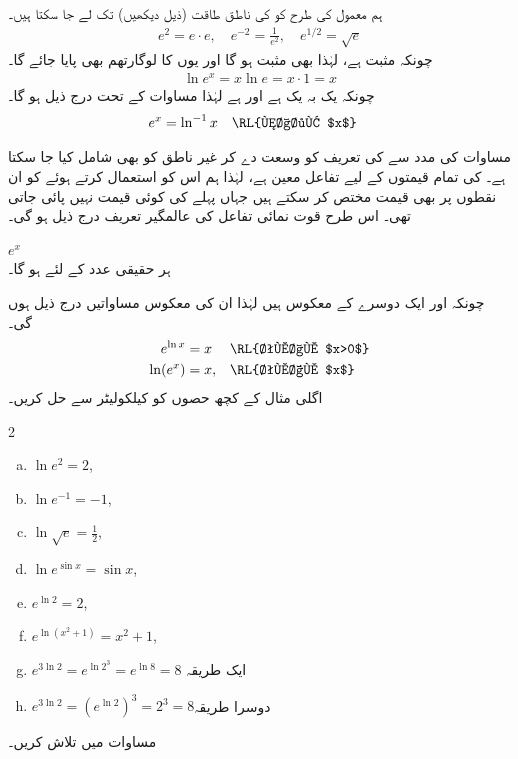 ہم معمول کی طرح    کو  کی ناطق طاقت (ذیل دیکھیں) تک   لے جا  سکتا ہیں۔
\begin{align*}
e^2=e\cdot e,\quad e^{-2}=\frac{1}{e^2},\quad e^{1/2}=\sqrt{e}
\end{align*}
چونکہ  مثبت ہے،  لہٰذا  بھی مثبت ہو گا اور یوں   کا لوگارتھم بھی پایا جائے گا۔
\begin{align}\label{مساوات_ماورائی_قوت_نمائی_لوگارتھم_الف}
\ln e^x=x\ln e=x\cdot 1=x
\end{align} 
چونکہ  یک بہ یک ہے اور  ہے لہٰذا مساوات  کے تحت درج ذیل ہو گا۔
\begin{align}\label{مساوات_ماورائی_قوت_نمائی_لوگارتھم_ب}
e^x&=\ln^{-1}x&&\text{\RL{ناطق $x$}}
\end{align}

مساوات  کی مدد سے  کی تعریف کو وسعت دے کر غیر ناطق  کو بھی شامل کیا جا سکتا ہے۔  کی تمام قیمتوں کے لیے تفاعل  معین ہے،  لہٰذا ہم اس کو استعمال کرتے ہوئے  کو ان نقطوں پر بھی قیمت مختص کر سکتے ہیں جہاں پہلے  کی کوئی قیمت نہیں پائی جاتی تھی۔ اس طرح قوت نمائی تفاعل کی عالمگیر تعریف درج ذیل ہو گی۔

 $e^x$\\
ہر حقیقی عدد  کے لئے   ہو گا۔

چونکہ  اور  ایک دوسرے کے معکوس ہیں لہٰذا ان کی معکوس مساواتیں درج ذیل ہوں گی۔
\begin{align}
e^{\ln x}&=x&&\text{\RL{تمام $x>0$}}\label{مساوات_ماورائی_الٹ_الف}\\
\ln(e^x)&=x,&&\text{\RL{تمام $x$}}\label{مساوات_ماورائی_الٹ_ب}
\end{align}
اگلی مثال کے کچھ حصوں کو کیلکولیٹر سے حل کریں۔

\begin{multicols}{2}
\begin{enumerate}[a.]
\item
$\ln e^2=2$,
\item
$\ln e^{-1}=-1$,
\item
$ \ln \sqrt{e}=\frac{1}{2}$,
\item
$\ln e^{\sin x}=\sin x$,
\item
$ e^{\ln 2}=2$,
\item
$ e^{\ln(x^2+1)}=x^2+1$,
\item
$e^{3\ln 2}=e^{\ln 2^3}=e^{\ln 8}=8$ \quad ایک طریقہ
\item
$e^{3\ln 2}=(e^{\ln 2})^3=2^3=8$\quad دوسرا طریقہ
\end{enumerate}
\end{multicols}
مساوات  میں  تلاش کریں۔

